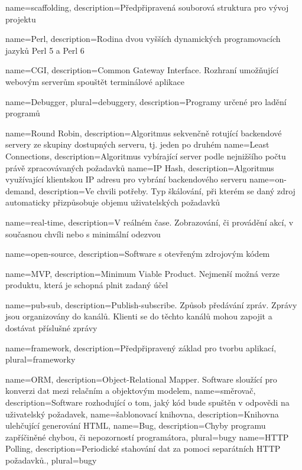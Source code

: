 {
    name={scaffolding},
    description={Předpřipravená souborová struktura pro vývoj projektu}
}

{
    name={Perl},
    description={Rodina dvou vyšších dynamických programovacích jazyků Perl 5 a Perl 6}
}

{
    name={CGI},
    description={Common Gateway Interface. Rozhraní umožňující webovým serverům spouštět terminálové aplikace}
}

{
    name={Debugger},
    plural={debuggery},
    description={Programy určené pro ladění programů}
}

{
    name={Round Robin},
    description={Algoritmus sekvenčně rotující backendové servery ze skupiny dostupných serveru, tj. jeden po druhém}
}
{
    name={Least Connections},
    description={Algoritmus vybírající server podle nejnižšího počtu právě zpracovávaných požadavků}
}
{
    name={IP Hash},
    description={Algoritmus využívající klientskou IP adresu pro vybrání backendového serveru}
}
{
    name={on-demand},
    description={Ve chvili potřeby. Typ škálování, při kterém se daný zdroj automaticky přizpůsobuje objemu uživatelských požadavků}
}

{
    name={real-time},
    description={V reálném čase. Zobrazování, či provádění akcí, v současnou chvíli nebo s minimální odezvou}
}

{
    name={open-source},
    description={Software s otevřeným zdrojovým kódem}
}

{
    name={MVP},
    description={Minimum Viable Product. Nejmenší možná verze produktu, která je schopná plnit zadaný účel}
}

{
    name={pub-sub},
    description={Publish-subscribe. Způsob předávání zpráv. Zprávy jsou organizovány do kanálů. Klienti se do těchto kanálů mohou zapojit a dostávat příslušné zprávy}
}

{
    name={framework},
    description={Předpřipravený základ pro tvorbu aplikací},
    plural={frameworky}
}

{
    name={ORM},
    description={Object-Relational Mapper. Software sloužící pro konverzi dat mezi relačním a objektovým modelem},
}
{
    name={směrovač},
    description={Software rozhodující o tom, jaký kód bude spuštěn v odpovědi na uživatelský požadavek},
}
{
    name={šablonovací knihovna},
    description={Knihovna ulehčující generování HTML},
}
{
    name={Bug},
    description={Chyby programu zapříčiněné chybou, či nepozorností programátora},
    plural={bugy}
}
{
    name={HTTP Polling},
    description={Periodické stahování dat za pomoci separátních HTTP požadavků.},
    plural={bugy}
}



